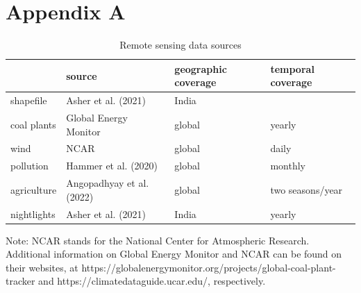 \documentclass[
]{article}
\begin{document}
\FloatBarrier
\newpage

\hypertarget{appendix-a}{%
\section*{Appendix A}\label{appendix-a}}

\setcounter{table}{0} \renewcommand{\thetable}{A\arabic{table}} \setcounter{figure}{0} \renewcommand{\thefigure}{A\arabic{figure}} 
\FloatBarrier

\begin{table}[H]

\caption{\label{tab:data}Remote sensing data sources}
\centering
\begin{threeparttable}
\begin{tabular}[t]{>{\raggedright\arraybackslash}p{2cm}>{\centering\arraybackslash}p{4.5cm}>{\centering\arraybackslash}p{3.5cm}>{\centering\arraybackslash}p{3.5cm}}
\toprule
  & source & geographic coverage & temporal coverage\\
\midrule
shapefile & Asher et al. (2021) & India & \\
coal plants & Global Energy Monitor & global & yearly\\
wind & NCAR & global & daily\\
pollution & Hammer et al. (2020) & global & monthly\\
agriculture & Angopadhyay et al. (2022) & global & two seasons/year\\
nightlights & Asher et al. (2021) & India & yearly\\
\bottomrule
\end{tabular}
\begin{tablenotes}[para]
\item Note: NCAR stands for the National Center for Atmospheric Research. Additional information on Global Energy Monitor and NCAR can be found on their websites, at https://globalenergymonitor.org/projects/global-coal-plant-tracker and https://climatedataguide.ucar.edu/, respectively.
\end{tablenotes}
\end{threeparttable}
\end{table}
\end{document}
